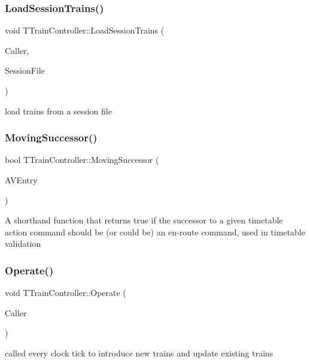 \subsubsection{\texorpdfstring{Load\+Session\+Trains()}{LoadSessionTrains()}}
{\footnotesize\ttfamily void T\+Train\+Controller\+::\+Load\+Session\+Trains (\begin{DoxyParamCaption}\item[{int}]{Caller,  }\item[{std\+::ifstream \&}]{Session\+File }\end{DoxyParamCaption})}

load trains from a session file \mbox{\label{class_t_train_controller_ae6c929171fa673b87e68694e6f48985d}} 
\subsubsection{\texorpdfstring{Moving\+Successor()}{MovingSuccessor()}}
{\footnotesize\ttfamily bool T\+Train\+Controller\+::\+Moving\+Successor (\begin{DoxyParamCaption}\item[{const \mbox{\hyperlink{class_t_action_vector_entry}{T\+Action\+Vector\+Entry}} \&}]{A\+V\+Entry }\end{DoxyParamCaption})}

A shorthand function that returns true if the successor to a given timetable action command should be (or could be) an en-\/route command, used in timetable validation \mbox{\label{class_t_train_controller_a20a1576dea1d86ed78fc5e9f46343481}} 
\subsubsection{\texorpdfstring{Operate()}{Operate()}}
{\footnotesize\ttfamily void T\+Train\+Controller\+::\+Operate (\begin{DoxyParamCaption}\item[{int}]{Caller }\end{DoxyParamCaption})}

called every clock tick to introduce new trains and update existing trains \mbox{\label{class_t_train_controller_a5c51eb1e0018e189966ffdbc5d251990}} 
